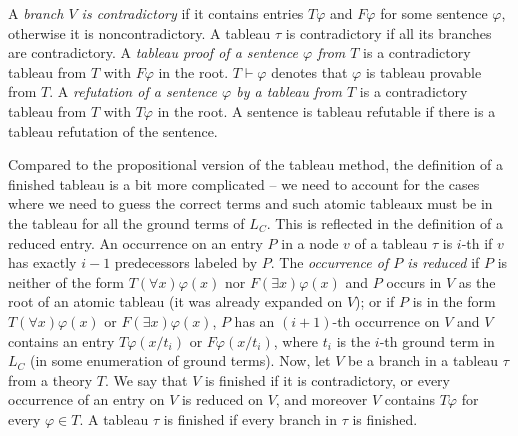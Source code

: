 
A \emph{branch $V$ is contradictory} if it contains entries $T \varphi$ and $F \varphi$ for some sentence $\varphi$, otherwise it is noncontradictory. A tableau $\tau$ is contradictory if all its branches are contradictory. A \emph{tableau proof of a sentence $\varphi$ from $T$} is a contradictory tableau from $T$ with $F \varphi$ in the root. $T \vdash \varphi$ denotes that $\varphi$ is tableau provable from $T$. A \emph{refutation of a sentence $\varphi$ by a tableau from $T$} is a contradictory tableau from $T$ with $T \varphi$ in the root. A sentence is tableau refutable if there is a tableau refutation of the sentence.

Compared to the propositional version of the tableau method, the definition of a finished tableau is a bit more complicated -- we need to account for the cases where we need to guess the correct terms and such atomic tableaux must be in the tableau for all the ground terms of $L_C$. This is reflected in the definition of a reduced entry. An occurrence on an entry $P$ in a node $v$ of a tableau $\tau$ is $i$-th if $v$ has exactly $i-1$ predecessors labeled by $P$. The \emph{occurrence of $P$ is reduced} if $P$ is neither of the form $T(\forall x)\varphi(x)$ nor $F(\exists x)\varphi(x)$ and $P$ occurs in $V$ as the root of an atomic tableau (it was already expanded on $V$); or if $P$ is in the form $T(\forall x)\varphi(x)$ or $F(\exists x)\varphi(x)$, $P$ has an $(i+1)$-th occurrence on $V$ and $V$ contains an entry $T \varphi(x/t_i)$ or $F \varphi(x/t_i)$, where $t_i$ is the $i$-th ground term in $L_C$ (in some enumeration of ground terms). Now, let $V$ be a branch in a tableau $\tau$ from a theory $T$. We say that $V$ is finished if it is contradictory, or every occurrence of an entry on $V$ is reduced on $V$, and moreover $V$ contains $T \varphi$ for every $\varphi \in T$. A tableau $\tau$ is finished if every branch in $\tau$ is finished.

